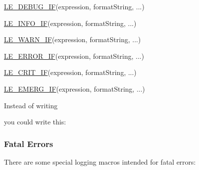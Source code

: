\begin{DoxyItemize}
\item \hyperlink{le__log_8h_a4c689f24157ca91e6d39827c967de734}{L\+E\+\_\+\+D\+E\+B\+U\+G\+\_\+\+I\+F}(expression, format\+String, ...)
\item \hyperlink{le__log_8h_ad98222f9a0871cde1893eac589841f17}{L\+E\+\_\+\+I\+N\+F\+O\+\_\+\+I\+F}(expression, format\+String, ...)
\item \hyperlink{le__log_8h_a8d8f204806cd5fc0455fe3caacf1d251}{L\+E\+\_\+\+W\+A\+R\+N\+\_\+\+I\+F}(expression, format\+String, ...)
\item \hyperlink{le__log_8h_aceaf11a11691d6c676e36dd317b38dbd}{L\+E\+\_\+\+E\+R\+R\+O\+R\+\_\+\+I\+F}(expression, format\+String, ...)
\item \hyperlink{le__log_8h_ae507036675ece2d77e8e285cf864a6f4}{L\+E\+\_\+\+C\+R\+I\+T\+\_\+\+I\+F}(expression, format\+String, ...)
\item \hyperlink{le__log_8h_a5dcf8dc55407a8f41ada2e85ff8131fe}{L\+E\+\_\+\+E\+M\+E\+R\+G\+\_\+\+I\+F}(expression, format\+String, ...)
\end{DoxyItemize}

Instead of writing 


you could write this\+: 
\hypertarget{c_logging_c_log_loging_fatals}{}\subsubsection{Fatal Errors}\label{c_logging_c_log_loging_fatals}
There are some special logging macros intended for fatal errors\+:


